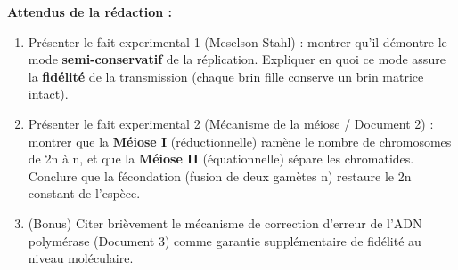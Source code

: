 \documentclass[11pt]{article}
\begin{document}
\begin{exercice}
\textbf{Attendus de la rédaction :}
\begin{enumerate}
    \item Présenter le fait experimental 1 (Meselson-Stahl) : montrer qu'il démontre le mode \textbf{semi-conservatif} de la réplication. Expliquer en quoi ce mode assure la \textbf{fidélité} de la transmission (chaque brin fille conserve un brin matrice intact).
    \item Présenter le fait experimental 2 (Mécanisme de la méiose / Document 2) : montrer que la \textbf{Méiose I} (réductionnelle) ramène le nombre de chromosomes de 2n à n, et que la \textbf{Méiose II} (équationnelle) sépare les chromatides. Conclure que la fécondation (fusion de deux gamètes n) restaure le 2n constant de l'espèce.
    \item (Bonus) Citer brièvement le mécanisme de correction d'erreur de l'ADN polymérase (Document 3) comme garantie supplémentaire de fidélité au niveau moléculaire.
\end{enumerate}
\end{exercice}
\end{document}
